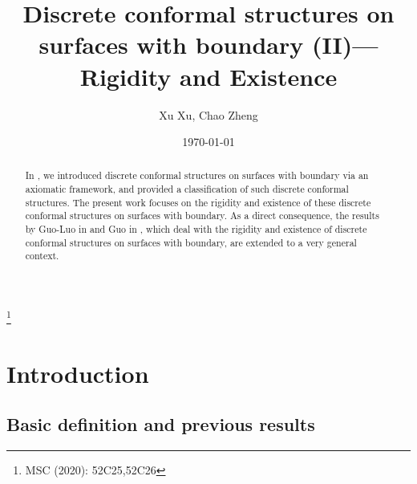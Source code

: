 \documentclass[12pt]{amsart}
\theoremstyle{definition}
\begin{document}
\title{\bf Discrete conformal structures on surfaces with boundary (II)---Rigidity and Existence}
\author{Xu Xu, Chao Zheng}

\date{\today}

\address{School of Mathematics and Statistics, Wuhan University, Wuhan, 430072, P.R.China}

\address{International Center for Mathematical Research (BICMR), Beijing (Peking) University, Beijing, 100871, P.R. China}

\thanks{MSC (2020): 52C25,52C26}


\begin{abstract}
In \cite{X-Z DCS1}, we introduced discrete conformal structures on surfaces with boundary via an axiomatic framework, and provided a classification of such discrete conformal structures.
The present work focuses on the rigidity and existence of these discrete conformal structures on surfaces with boundary. 
As a direct consequence, the results by Guo-Luo in \cite{GL2} and Guo in \cite{Guo}, which deal with the rigidity and existence of discrete conformal structures on surfaces with boundary, are extended to a very general context.
\end{abstract}

\maketitle


\tableofcontents

\section{Introduction}\label{section 1}

\subsection{Basic definition and previous results}
\end{document}
